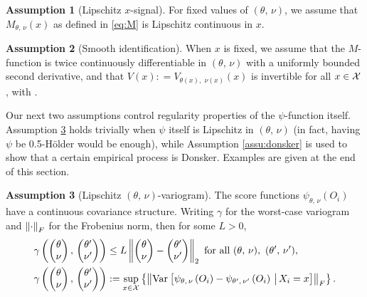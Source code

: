 \documentclass[aos]{imsart}
\theoremstyle{plain}
\theoremstyle{definition}
\newtheorem{assu}{Assumption}
\theoremstyle{remark}
\begin{document}
\begin{CJK}{UTF8}{gbsn}
\begin{assu}[Lipschitz $x$-signal]
\label{assu:lip}
For fixed values of $(\theta, \, \nu)$, we assume that $M_{\theta, \, \nu}(x)$ 
as defined in \eqref{eq:M} is Lipschitz continuous in $x$.
\end{assu}

\begin{assu}[Smooth identification]
\label{assu:identification}
When $x$ is fixed, we assume that the $M$-function is twice continuously differentiable
in $(\theta, \, \nu)$ with a uniformly bounded second derivative, and
that $V(x): = V_{\theta(x), \, \, \nu(x)}(x)$ is invertible for all $x \in \mathcal{X}$, with
.
\end{assu}

Our next two assumptions control regularity properties of the $\psi$-function itself.
Assumption \ref{assu:covariance} holds trivially when $\psi$ itself is
Lipschitz in $(\theta, \, \nu)$ (in fact, having $\psi$ be 0.5-H{\"o}lder would be enough),
while Assumption \ref{assu:donsker} is used to show that a certain empirical process is
Donsker. Examples are given at the end of this section.

\begin{assu}[Lipschitz $(\theta, \, \nu)$-variogram]
\label{assu:covariance}
The score functions $\psi_{\theta, \, \nu}(O_i)$ 
have a continuous covariance structure.
Writing $\gamma$ for the worst-case variogram
and $\left\lVert\cdot\right\rVert_F$ for the Frobenius norm,
then for some $L > 0$,
\begin{equation}
\label{eq:variogram}
\begin{split}
&\gamma\p{ \begin{pmatrix} \theta \\ \nu \end{pmatrix}, \,  \begin{pmatrix} \theta' \\ \nu' \end{pmatrix}} \leq
L \Norm{\begin{pmatrix} \theta \\ \nu \end{pmatrix} -   \begin{pmatrix} \theta' \\ \nu' \end{pmatrix}}_2
\text{ for all } (\theta,\, \nu), \ (\theta',\,\nu'), \\
&\gamma\p{ \begin{pmatrix} \theta \\ \nu \end{pmatrix}, \,  \begin{pmatrix} \theta' \\ \nu' \end{pmatrix}}
:= \sup_{x \in \xx} \cb{\Norm{\Var{\psi_{\theta, \, \nu}\p{O_i} - \psi_{\theta', \, \nu'}\p{O_i} \cond X_i = x}}_F}.
\end{split}
\end{equation}
\end{assu}


\end{CJK}
\end{document}
